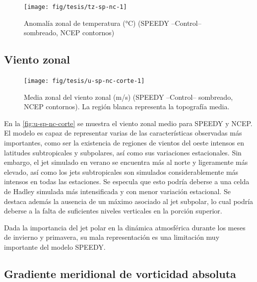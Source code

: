 \documentclass[spanish,a4paper,12pt,oneside]{book}
\begin{document}
\begin{landscape}\begin{figure}

{\centering \texttt{[image: fig/tesis/tz-sp-nc-1]} 

}

\caption{Anomalía zonal de temperatura (°C) (SPEEDY --Control-- sombreado, NCEP contornos)}\label{fig:tz-sp-nc}
\end{figure}
\end{landscape}

\hypertarget{viento-zonal-1}{%
\subsection{Viento zonal}\label{viento-zonal-1}}

\begin{figure}
\texttt{[image: fig/tesis/u-sp-nc-corte-1]} \caption{Media zonal del viento zonal (m/s) (SPEEDY --Control-- sombreado, NCEP contornos). La región blanca representa la topografía media.}\label{fig:u-sp-nc-corte}
\end{figure}

En la \autoref{fig:u-sp-nc-corte} se muestra el viento zonal medio para
SPEEDY y NCEP. El modelo es capaz de representar varias de las
características observadas más importantes, como ser la existencia de
regiones de vientos del oeste intensos en latitudes subtropicales y
subpolares, así como sus variaciones estacionales. Sin embargo, el jet
simulado en verano se encuentra más al norte y ligeramente más elevado,
así como los jets subtropicales son simulados considerablemente más
intensos en todas las estaciones. Se especula que esto podría deberse a
una celda de Hadley simulada más intensificada y con menor variación
estacional. Se destaca además la ausencia de un máximo asociado al jet
subpolar, lo cual podría deberse a la falta de suficientes niveles
verticales en la porción superior.

Dada la importancia del jet polar en la dinámica atmosférica durante los
meses de invierno y primavera, su mala representación es una limitación
muy importante del modelo SPEEDY.

\hypertarget{gradiente-meridional-de-vorticidad-absoluta}{%
\subsection{Gradiente meridional de vorticidad
absoluta}\label{gradiente-meridional-de-vorticidad-absoluta}}
\end{document}

